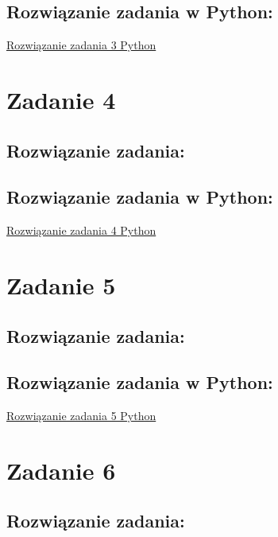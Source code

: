 \documentclass{article}
\begin{document}
	
	\subsection*{Rozwiązanie zadania w Python:}
	\href{https://github.com/slaw999999999/OEI/blob/main/Zadanie1.ipynb}{Rozwiązanie zadania 3 Python}
	
	\newpage
	\section*{Zadanie 4}
	
	
	\subsection*{Rozwiązanie zadania:}
	
	
	\subsection*{Rozwiązanie zadania w Python:}
	\href{https://github.com/slaw999999999/OEI/blob/main/Zadanie1.ipynb}{Rozwiązanie zadania 4 Python}
	
	\newpage
	\section*{Zadanie 5}
	
	
	\subsection*{Rozwiązanie zadania:}
	
	
	\subsection*{Rozwiązanie zadania w Python:}
	\href{https://github.com/slaw999999999/OEI/blob/main/Zadanie1.ipynb}{Rozwiązanie zadania 5 Python}
	
	\newpage
	\section*{Zadanie 6}
	
	
	\subsection*{Rozwiązanie zadania:}
	
	
\end{document}
